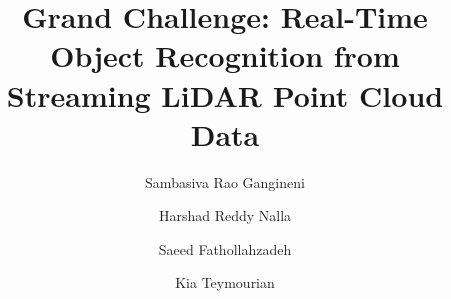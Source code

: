 \documentclass[sigconf]{acmart}
\begin{document}
%

\title[Real-Time Object Recognition from Streaming LiDAR Point Cloud Data]{Grand Challenge: Real-Time Object Recognition from Streaming LiDAR Point Cloud Data}


%


\author{Sambasiva Rao Gangineni}

\author{Harshad Reddy Nalla}


\author{Saeed Fathollahzadeh}

\author{Kia Teymourian}



%
\renewcommand{\shortauthors}{Gangineni, et al.}
\end{document}
